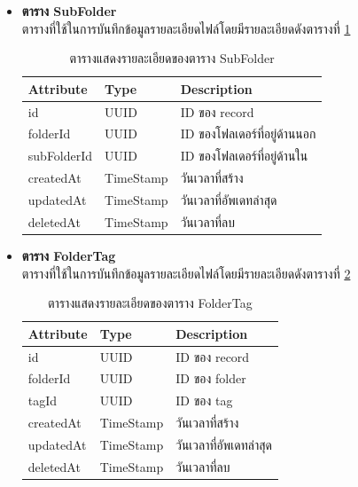 \documentclass[12pt,oneside,openright,a4paper]{cpe-thai-project}
\begin{document}
\begin{itemize}
\item \textbf{ตาราง SubFolder}\\
ตารางที่ใช้ในการบันทึกข้อมูลรายละเอียดไฟล์โดยมีรายละเอียดดังตารางที่ \ref{tbl:dbSubFolder}
\begin{table}[!ht]
    \centering
    \begin{tabular}{|p{4cm}|p{2cm}|p{6cm}|}
    \hline
    \textbf{Attribute} & \textbf{Type} & \textbf{Description}   \\ \hline
    id          & UUID      & ID ของ record                \\ \hline
    folderId    & UUID      & ID ของโฟลเดอร์ที่อยู่ด้านนอก \\ \hline
    subFolderId & UUID      & ID ของโฟลเดอร์ที่อยู่ด้านใน  \\ \hline
    createdAt   & TimeStamp & วันเวลาที่สร้าง              \\ \hline
    updatedAt   & TimeStamp & วันเวลาที่อัพเดทล่าสุด       \\ \hline
    deletedAt   & TimeStamp & วันเวลาที่ลบ                \\ \hline  
    \end{tabular}
    \caption{\centering  ตารางแสดงรายละเอียดของตาราง SubFolder} \label{tbl:dbSubFolder}
\end{table}

\newpage
\item \textbf{ตาราง FolderTag}\\
ตารางที่ใช้ในการบันทึกข้อมูลรายละเอียดไฟล์โดยมีรายละเอียดดังตารางที่ \ref{tbl:dbFolderTag}
\begin{table}[!ht]
    \centering
    \begin{tabular}{|p{4cm}|p{2cm}|p{6cm}|}
    \hline
    \textbf{Attribute} & \textbf{Type} & \textbf{Description}   \\ \hline
    id        & UUID      & ID ของ record          \\ \hline
    folderId  & UUID      & ID ของ folder          \\ \hline
    tagId     & UUID      & ID ของ tag             \\ \hline
    createdAt & TimeStamp & วันเวลาที่สร้าง        \\ \hline
    updatedAt & TimeStamp & วันเวลาที่อัพเดทล่าสุด \\ \hline
    deletedAt & TimeStamp & วันเวลาที่ลบ     \\ \hline
    \end{tabular}
    \caption{\centering  ตารางแสดงรายละเอียดของตาราง FolderTag} \label{tbl:dbFolderTag}
\end{table}


\end{itemize}
\end{document}
